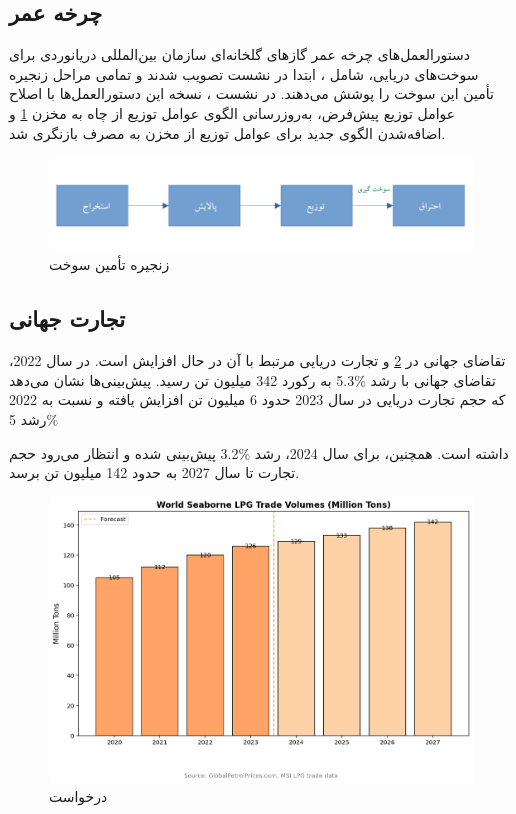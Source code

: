 \subsection{چرخه عمر}
دستورالعمل‌های چرخه عمر گازهای گلخانه‌ای 
 سازمان بین‌المللی دریانوردی  برای سوخت‌های دریایی، شامل 
 ، ابتدا در نشست 
 تصویب شدند و تمامی مراحل زنجیره تأمین این سوخت را پوشش می‌دهند. در نشست
  ،
   نسخه
    این دستورالعمل‌ها 
    با اصلاح عوامل توزیع پیش‌فرض، به‌روزرسانی الگوی عوامل توزیع از چاه به مخزن
    \cref{Suplly-Chain}
     و اضافه‌شدن الگوی جدید برای عوامل توزیع از مخزن به مصرف 
      بازنگری شد.
 \cite{Das2018}
 \begin{figure}[!h]
 	\centering
 	\includegraphics[width=15cm]{Figures/LPG/supply-chain.png}
 	\caption{ زنجیره تأمین سوخت}\label{Suplly-Chain}
 \end{figure}
 
\subsection{تجارت جهانی}
 تقاضای جهانی  
 در
  \cref{future}
 و تجارت دریایی مرتبط با آن در حال افزایش است. در سال 2022،
  تقاضای جهانی
    با رشد 
    $\%$5.3
    به رکورد 342 میلیون تن رسید. پیش‌بینی‌ها نشان می‌دهد که حجم تجارت دریایی
     در سال 2023 حدود 6 میلیون تن افزایش یافته و نسبت به 2022 رشد 5$\%$
   
      داشته است. همچنین، برای سال 2024، رشد
      $\%$3.2
        پیش‌بینی شده و انتظار می‌رود حجم تجارت تا سال 2027 به حدود 142 میلیون تن برسد.
 \begin{figure}[!h]
	\centering
	\includegraphics[width=15cm]{Figures/LPG/future.png}
	\caption{ درخواست }\label{future}
\end{figure} 
 
